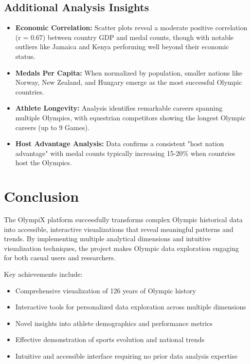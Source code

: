 \documentclass[a4paper, 12pt]{article}
\begin{document}
\subsection{Additional Analysis Insights}
\begin{itemize}[leftmargin=*]
    \item \textbf{Economic Correlation:} Scatter plots reveal a moderate positive correlation (r = 0.67) between country GDP and medal counts, though with notable outliers like Jamaica and Kenya performing well beyond their economic status.
    
    \item \textbf{Medals Per Capita:} When normalized by population, smaller nations like Norway, New Zealand, and Hungary emerge as the most successful Olympic countries.
    
    \item \textbf{Athlete Longevity:} Analysis identifies remarkable careers spanning multiple Olympics, with equestrian competitors showing the longest Olympic careers (up to 9 Games).
    
    \item \textbf{Host Advantage Analysis:} Data confirms a consistent "host nation advantage" with medal counts typically increasing 15-20\% when countries host the Olympics.
\end{itemize}

\section{Conclusion}
The OlympiX platform successfully transforms complex Olympic historical data into accessible, interactive visualizations that reveal meaningful patterns and trends. By implementing multiple analytical dimensions and intuitive visualization techniques, the project makes Olympic data exploration engaging for both casual users and researchers.

Key achievements include:
\begin{itemize}[leftmargin=*]
    \item Comprehensive visualization of 126 years of Olympic history
    \item Interactive tools for personalized data exploration across multiple dimensions
    \item Novel insights into athlete demographics and performance metrics
    \item Effective demonstration of sports evolution and national trends
    \item Intuitive and accessible interface requiring no prior data analysis expertise
\end{itemize}
\end{document}
